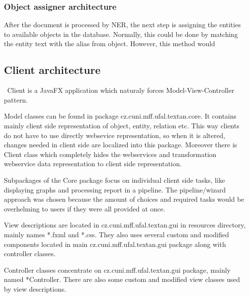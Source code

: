 \subsubsection{Object assigner architecture} %


After the document is processed by NER, the next step is assigning the entities to available objects in the database. 
Normally, this could be done by matching the entity text with the alias from object. However, this method would 


\subsection{Client architecture}


\textan\ Client is a JavaFX application which naturaly forces Model-View-Controller
pattern.

Model classes can be found in package cz.cuni.mff.ufal.textan.core. It contains
mainly client side representation of object, entity, relation etc. This way
clients do not have to use directly websevice representation, so when it is
altered, changes needed in client side are localized into this package. Moreover
there is Client class which completely hides the webservices and transformation
webservice data representation to client side representation.

Subpackages of the Core package focus on individual client side tasks, like
displaying graphs and processing report in a pipeline. The pipeline/wizard
approach was chosen because the amount of choices and required tasks would
be overhelming to users if they were all provided at once.

View descriptions are located in cz.cuni.mff.ufal.textan.gui in resources
directory, mainly names *.fxml and *.css. They also uses several custom and
modified components located in main cz.cuni.mff.ufal.textan.gui package along
with controller classes.

Controller classes concentrate on cz.cuni.mff.ufal.textan.gui package,
mainly named *Controller. There are also some custom and modified view classes
used by view descriptions.
